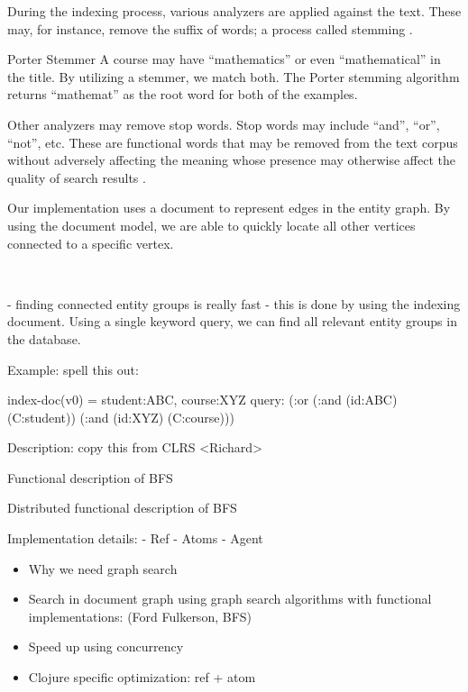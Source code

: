 			During the indexing process, various analyzers are applied against the text.  These may, for instance, remove the suffix of words; a process called stemming \cite{porter-97}.
			
			\begin{ex}{Porter Stemmer}
				A course may have ``mathematics'' or even ``mathematical'' in the title.  By utilizing a stemmer, we match both.  The Porter stemming algorithm returns ``mathemat'' as the root word for both of the examples.
			\end{ex}
			
			Other analyzers may remove stop words.  Stop words may include ``and'', ``or'', ``not'', etc.  These are functional words that may be removed from the text corpus without adversely affecting the meaning whose presence may otherwise affect the quality of search results \cite{silva-03}.
			
			Our implementation uses a document to represent edges in the entity graph.  By using the document model, we are able to quickly locate all other vertices connected to a specific vertex.
			
			\
		

		- finding connected entity groups is really fast - this is done by using the
		indexing document.  Using a single keyword query, we can find all relevant
		entity groups in the database.
		
		Example: spell this out:
		
		index-doc(v0) = student:ABC, course:XYZ
		query: (:or (:and (id:ABC) (C:student)) 
		(:and (id:XYZ) (C:course)))
		
		
		Description: copy this from CLRS
		<Richard>
		
		Functional description of BFS
		
		Distributed functional description of BFS
		
		Implementation details:
		- Ref
		- Atoms
		- Agent
		
		\begin{itemize}
			\item Why we need graph search
			\item Search in document graph using graph search algorithms with functional implementations: (Ford Fulkerson, BFS)
			\item Speed up using concurrency
			\item Clojure specific optimization: ref + atom
		\end{itemize}